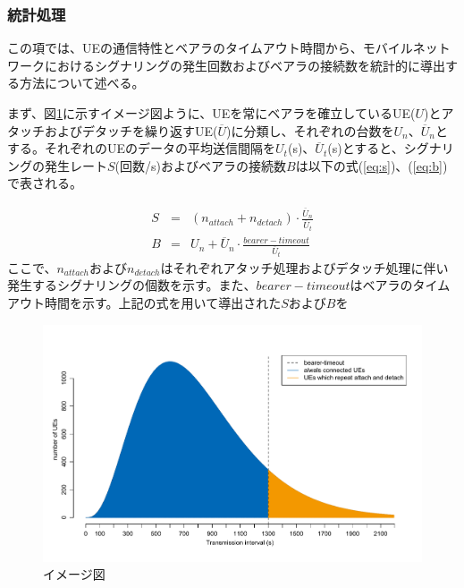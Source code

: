 \documentclass[a4j]{ujarticle}
\begin{document}
\subsubsection{統計処理}
この項では、UEの通信特性とベアラのタイムアウト時間から、モバイルネットワークにおけるシグナリングの発生回数およびベアラの接続数を統計的に導出する方法について述べる。

まず、図\ref{static}に示すイメージ図ように、UEを常にベアラを確立しているUE($U$)とアタッチおよびデタッチを繰り返すUE($\overline{U}$)に分類し、それぞれの台数を$U_n$、$\overline{U}_n$とする。それぞれのUEのデータの平均送信間隔を$U_t$(s)、$\overline{U}_t$(s)とすると、シグナリングの発生レート$S$(回数/s)およびベアラの接続数$B$は以下の式(\ref{eq:s})、(\ref{eq:b})で表される。

\begin{eqnarray}
  S & = & (n_{attach} + n_{detach}) \cdot  \frac{\overline{U}_n}{\overline{U}_t} \label{eq:s}  \\
	B & = & U_n + \overline{U}_n \cdot \frac{bearer-timeout}{\overline{U}_t}
	\label{eq:b}
\end{eqnarray}
ここで、$n_{attach} および n_{detach}$はそれぞれアタッチ処理およびデタッチ処理に伴い発生するシグナリングの個数を示す。また、$bearer-timeout$はベアラのタイムアウト時間を示す。上記の式を用いて導出された$S$および$B$を
\begin{figure}[htbp]
	\centering
	\includegraphics[width=0.7\hsize]{static.pdf}
  \caption{イメージ図}
	\label{static}
\end{figure}
\end{document}
